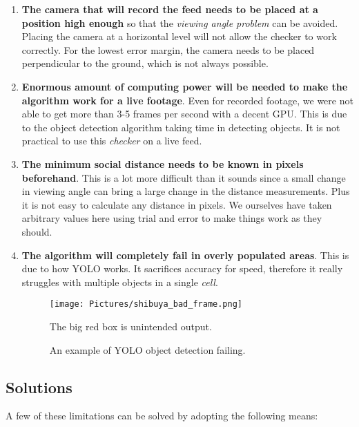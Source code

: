 \documentclass[a4paper]{article}
\begin{document}
\begin{enumerate}
    \item \textbf{The camera that will record the feed needs to be placed at a position high enough} so that the \textit{viewing angle problem} can be avoided. Placing the camera at a horizontal level will not allow the checker to work correctly. For the lowest error margin, the camera needs to be placed perpendicular to the ground, which is not always possible.
    \item \textbf{Enormous amount of computing power will be needed to make the algorithm work for a live footage}. Even for recorded footage, we were not able to get more than 3-5 frames per second with a decent GPU. This is due to the object detection algorithm taking time in detecting objects. It is not practical to use this \textit{checker} on a live feed.
    \item \textbf{The minimum social distance needs to be known in pixels beforehand}. This is a lot more difficult than it sounds since a small change in viewing angle can bring a large change in the distance measurements. Plus it is not easy to calculate any distance in pixels. We ourselves have taken arbitrary values here using trial and error to make things work as they should.
    \item \textbf{The algorithm will completely fail in overly populated areas}. This is due to how YOLO works. It sacrifices accuracy for speed, therefore it really struggles with multiple objects in a single \textit{cell}.
    \begin{figure}[h]
        \centering
        \texttt{[image: Pictures/shibuya\_bad\_frame.png]}
        \caption{An example of YOLO object detection failing.}{The big red box is unintended output.}
        \label{fig:shibuyaFail}
    \end{figure}
\end{enumerate}

\subsection{Solutions}

A few of these limitations can be solved by adopting the following means:
\end{document}
